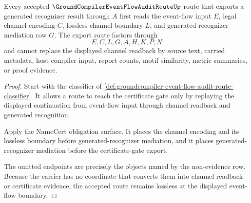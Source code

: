 \begin{theorem}
\label{thm:groundcompiler-event-flow-audit-route-channel-lossless-boundary}
Every accepted $\GroundCompilerEventFlowAuditRouteUp$ route that exports a generated recognizer result through $A$ first reads the event-flow input $E$, legal channel encoding $C$, lossless channel boundary $L$, and generated-recognizer mediation row $G$. The export route factors through
$$
E,C,L,G,A,H,K,P,N
$$
and cannot replace the displayed channel readback by source text, carried metadata, host compiler input, report counts, motif similarity, metric summaries, or proof evidence.
\end{theorem}
\begin{proof}
Start with the classifier of \autoref{def:groundcompiler-event-flow-audit-route-classifier}. It allows a route to reach the certificate gate only by replaying the displayed continuation from event-flow input through channel readback and generated recognition.

Apply the NameCert obligation surface. It places the channel encoding and its lossless boundary before generated-recognizer mediation, and it places generated-recognizer mediation before the certificate-gate export.

The omitted endpoints are precisely the objects named by the non-evidence row. Because the carrier has no coordinate that converts them into channel readback or certificate evidence, the accepted route remains lossless at the displayed event-flow boundary.
\end{proof}

